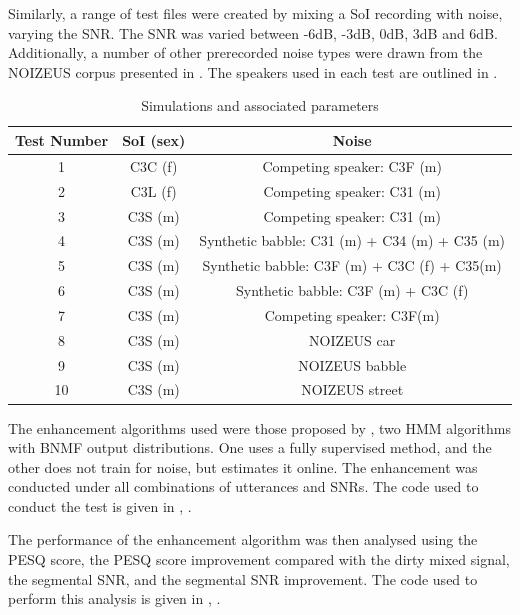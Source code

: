 Similarly, a range of test files were created by mixing a \ac{SoI}
recording with noise, varying the \ac{SNR}. The \ac{SNR} was varied
between -6dB, -3dB, 0dB, 3dB and 6dB. Additionally, a number of other
prerecorded noise types were drawn from the NOIZEUS corpus presented
in \citep{Hu2006}. The speakers used in each test are outlined in
.

\begin{table}
\protect\caption{\label{tab:test-params}Simulations and associated parameters}


\begin{centering}
\begin{tabular}{|c|c|c|}
\hline 
Test Number & \ac{SoI} (sex) & Noise\tabularnewline
\hline 
\hline 
1 & C3C (f) & Competing speaker: C3F (m)\tabularnewline
\hline 
2 & C3L (f) & Competing speaker: C31 (m)\tabularnewline
\hline 
3 & C3S (m) & Competing speaker: C31 (m)\tabularnewline
\hline 
4 & C3S (m) & Synthetic babble: C31 (m) + C34 (m) + C35 (m)\tabularnewline
\hline 
5 & C3S (m) & Synthetic babble: C3F (m) + C3C (f) + C35(m)\tabularnewline
\hline 
6 & C3S (m) & Synthetic babble: C3F (m) + C3C (f)\tabularnewline
\hline 
7 & C3S (m) & Competing speaker: C3F(m)\tabularnewline
\hline 
8 & C3S (m) & NOIZEUS car\tabularnewline
\hline 
9 & C3S (m) & NOIZEUS babble\tabularnewline
\hline 
10 & C3S (m) & NOIZEUS street\tabularnewline
\hline 
\end{tabular}
\par\end{centering}

\end{table}


The enhancement algorithms used were those proposed by \citet{mohammadiha2013supervised},
two \ac{HMM} algorithms with \ac{BNMF} output distributions. One
uses a fully supervised method, and the other does not train for noise,
but estimates it online. The enhancement was conducted under all combinations
of utterances and \acp{SNR}. The code used to conduct the test is
given in , \textit{}.

The performance of the enhancement algorithm was then analysed using
the \ac{PESQ} score, the \ac{PESQ} score improvement compared with
the dirty mixed signal, the segmental \ac{SNR}, and the segmental
\ac{SNR} improvement. The code used to perform this analysis is given
in , \textit{}.


